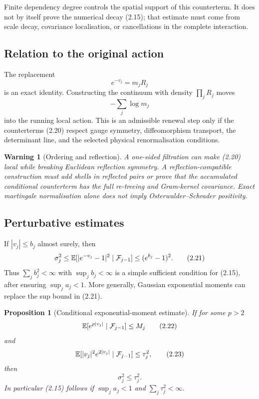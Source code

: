 \documentclass[11pt]{article}
\newtheorem{proposition}[theorem]{Proposition}
\newtheorem{warning}[theorem]{Warning}
\theoremstyle{remark}
\begin{document}
Finite dependency degree controls the spatial support of this
counterterm.  It does not by itself prove the numerical decay
(2.15); that estimate must come from scale decay, covariance
localisation, or cancellations in the complete interaction.

\subsection{Relation to the original action}

The replacement
\[
                              e^{-v_j}=m_jR_j                \tag{2.19}
\]
is an exact identity.  Constructing the continuum with density
\(\prod_jR_j\) moves
\[
                              -\sum_j\log m_j                \tag{2.20}
\]
into the running local action.  This is an admissible renewal step
only if the counterterms (2.20) respect gauge symmetry,
diffeomorphism transport, the determinant line, and the selected
physical renormalisation conditions.

\begin{warning}[Ordering and reflection]
\label{warn:v12v2-order}
A one-sided filtration can make (2.20) local while breaking Euclidean
reflection symmetry.  A reflection-compatible construction must add
shells in reflected pairs or prove that the accumulated conditional
counterterm has the full re-treeing and Gram-kernel covariance.
Exact martingale normalisation alone does not imply
Osterwalder--Schrader positivity.
\end{warning}

\subsection{Perturbative estimates}

If \(|v_j|\le b_j\) almost surely, then
\[
 \sigma_j^2
 \le\mathbb E[|e^{-v_j}-1|^2\mid{\cal F}_{j-1}]
 \le(e^{b_j}-1)^2.                                         \tag{2.21}
\]
Thus \(\sum_j b_j^2<\infty\) with \(\sup_jb_j<\infty\) is a simple
sufficient condition for (2.15), after ensuring
\(\sup_ja_j<1\).  More generally, Gaussian exponential moments can
replace the sup bound in (2.21).

\begin{proposition}[Conditional exponential-moment estimate]
\label{prop:v12v2-exponential}
If for some \(p>2\)
\[
 \mathbb E[e^{p|v_j|}\mid{\cal F}_{j-1}]\le M_j             \tag{2.22}
\]
and
\[
 \mathbb E[|v_j|^2e^{2|v_j|}
                 \mid{\cal F}_{j-1}]\le\tau_j^2,            \tag{2.23}
\]
then
\[
                              \sigma_j^2\le\tau_j^2.          \tag{2.24}
\]
In particular (2.15) follows if
\(\sup_ja_j<1\) and \(\sum_j\tau_j^2<\infty\).
\end{proposition}
\end{document}
